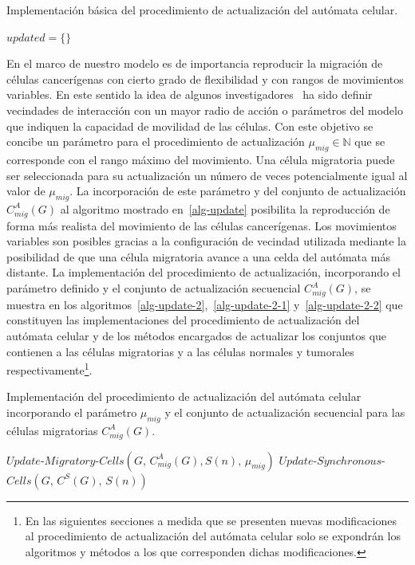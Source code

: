 \begin{algorithm}[!ht]
\caption{Implementaci\'on b\'asica del procedimiento de actualizaci\'on del aut\'omata celular.}\label{alg-update}
$updated=\lbrace \rbrace$\;
\end{algorithm}

En el marco de nuestro modelo es de importancia reproducir la migraci\'on de c\'elulas cancer\'igenas con cierto grado de flexibilidad y con rangos de movimientos variables. En este sentido la idea de algunos investigadores~\cite{anderson,kansal3} ha sido definir vecindades de interacci\'on con un mayor radio de acci\'on o par\'ametros del modelo que indiquen la capacidad de movilidad de las c\'elulas. Con este objetivo se concibe un par\'ametro para el procedimiento de actualizaci\'on $\mu_{mig} \in \mathbb{N}$ que se corresponde con el rango m\'aximo del movimiento. Una c\'elula migratoria puede ser seleccionada para su actualizaci\'on un n\'umero de veces potencialmente igual al valor de $\mu_{mig}$. La incorporaci\'on de este par\'ametro y del conjunto de actualizaci\'on $C_{mig}^A(G)$ al algoritmo mostrado en~\ref{alg-update} posibilita la reproducci\'on de forma m\'as realista del movimiento de las c\'elulas cancer\'igenas. Los movimientos variables son posibles gracias a la configuraci\'on de vecindad utilizada mediante la posibilidad de que una c\'elula migratoria avance a una celda del aut\'omata m\'as distante. La implementaci\'on del procedimiento de actualizaci\'on, incorporando el par\'ametro definido y el conjunto de actualizaci\'on secuencial $C_{mig}^A(G)$, se muestra en los algoritmos~\ref{alg-update-2},~\ref{alg-update-2-1} y~\ref{alg-update-2-2} que constituyen las implementaciones del procedimiento de actualizaci\'on del aut\'omata celular y de los m\'etodos encargados de actualizar los conjuntos que contienen a las c\'elulas migratorias y a las c\'elulas normales y tumorales respectivamente\footnote{En las siguientes secciones a medida que se presenten nuevas modificaciones al procedimiento de actualizaci\'on del aut\'omata celular solo se expondr\'an los algoritmos y m\'etodos a los que corresponden dichas modificaciones.}. 

\begin{algorithm}[!ht]
\caption{Implementaci\'on del procedimiento de actualizaci\'on del aut\'omata celular incorporando el par\'ametro $\mu_{mig}$ y el conjunto de actualizaci\'on secuencial para las c\'elulas migratorias $C_{mig}^A(G)$.} \label{alg-update-2}
$Update$-$Migratory$-$Cells(G,\,C_{mig}^A(G),S(n),\,\mu_{mig})$\;
$Update$-$Synchronous$-$Cells(G,\,C^S(G),\,S(n))$\;
\end{algorithm}

